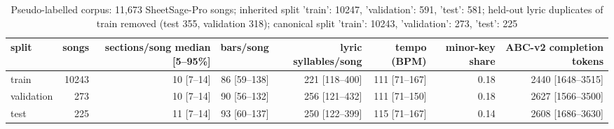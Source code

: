 \begin{table}[t]
\centering
\small
\begin{tabular}{lrrrrrrr}
\toprule
split & songs & sections/song median [5–95\%] & bars/song & lyric syllables/song & tempo (BPM) & minor-key share & ABC-v2 completion tokens \\
\midrule
train & 10243 & 10 [7–14] & 86 [59–138] & 221 [118–400] & 111 [71–167] & 0.18 & 2440 [1648–3515] \\
validation & 273 & 10 [7–14] & 90 [56–132] & 256 [121–432] & 111 [71–150] & 0.18 & 2627 [1566–3500] \\
test & 225 & 11 [7–14] & 93 [60–137] & 250 [122–399] & 115 [71–167] & 0.14 & 2608 [1686–3630] \\
\bottomrule
\end{tabular}
\caption{Pseudo-labelled corpus: 11,673 SheetSage-Pro songs; inherited split {'train': 10247, 'validation': 591, 'test': 581}; held-out lyric duplicates of train removed (test 355, validation 318); canonical split {'train': 10243, 'validation': 273, 'test': 225}}
\label{tab:table1_dataset}
\end{table}
